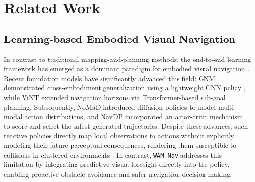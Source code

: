 \documentclass{article}
\begin{document}

\section{Related Work}

\subsection{Learning-based Embodied Visual Navigation}

In contrast to traditional mapping-and-planning methods, the end-to-end learning framework has emerged as a dominant paradigm for embodied visual navigation \citep{zhu2021survey, zhu2017target, savva2019habitat, wijmans2020ddppo, zeng2025navidiffusor}. Recent foundation models have significantly advanced this field: GNM \citep{shah2023gnm} demonstrated cross-embodiment generalization using a lightweight CNN policy \citep{krizhevsky2012imagenet}, while ViNT \citep{shah2023vint} extended navigation horizons via Transformer-based sub-goal planning. Subsequently, NoMaD \citep{sridhar2024nomad} introduced diffusion policies \citep{janner2023policy} to model multi-modal action distributions, and NavDP \citep{cai2025navdp} incorporated an actor-critic mechanism to score and select the safest generated trajectories. Despite these advances, such reactive policies directly map local observations to actions without explicitly modeling their future perceptual consequences, rendering them susceptible to collisions in cluttered environments \citep{qin2025navigatediff, shen2026efficient}. In contrast, \texttt{WAM-Nav} addresses this limitation by integrating predictive visual foresight directly into the policy, enabling proactive obstacle avoidance and safer navigation decision-making.
\end{document}
